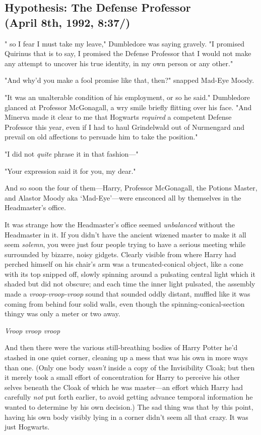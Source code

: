 \subsection{Hypothesis: The Defense Professor\\
\vspace{-2\baselineskip}
(April 8th, 1992, 8:37\PM/)}

"{\el} so I fear I must take my leave," Dumbledore was saying gravely. "I
promised Quirinus{\el} that is to say, I promised the Defense
Professor{\el} that I would not make any attempt to uncover his true
identity, in my own person or any other."

"And why'd you make a fool promise like that, then?" snapped Mad-Eye Moody.

"It was an unalterable condition of his employment, or so he said." Dumbledore
glanced at Professor McGonagall, a wry smile briefly flitting over his face.
"And Minerva made it clear to me that Hogwarts \emph{required} a competent
Defense Professor this year, even if I had to haul Grindelwald out of
Nurmengard and prevail on old affections to persuade him to take the position."

"I did not \emph{quite} phrase it in that fashion\mbox{---}"

"Your expression said it for you, my dear."

And so soon the four of them---Harry, Professor McGonagall, the Potions Master,
and Alastor Moody aka `Mad-Eye'---were ensconced all by themselves in the
Headmaster's office.

It was strange how the Headmaster's office seemed{\el}
\emph{unbalanced{\el}} without the Headmaster in it. If you didn't have the
ancient wizened master to make it all seem \emph{solemn}, you were just four
people trying to have a serious meeting while surrounded by bizarre, noisy
gidgets. Clearly visible from where Harry had perched himself on his chair's
arm was a truncated-conical object, like a cone with its top snipped off,
slowly spinning around a pulsating central light which it shaded but did not
obscure; and each time the inner light pulsated, the assembly made a
\emph{vroop-vroop-vroop} sound that sounded oddly distant, muffled like it was
coming from behind four solid walls, even though the spinning-conical-section
thingy was only a meter or two away.

\emph{Vroop{\el} vroop{\el} vroop}{\el}

And then there were the various still-breathing bodies of Harry Potter he'd
stashed in one quiet corner, cleaning up a mess that was his own in more ways
than one. (Only one body \emph{wasn't} inside a copy of the Invisibility Cloak;
but then it merely took a small effort of concentration for Harry to perceive
his other selves beneath the Cloak of which he was master---an effort which
Harry had carefully \emph{not} put forth earlier, to avoid getting advance
temporal information he wanted to determine by his own decision.) The sad thing
was that by this point, having his own body visibly lying in a corner didn't
seem all that crazy. It was just{\el} Hogwarts.

